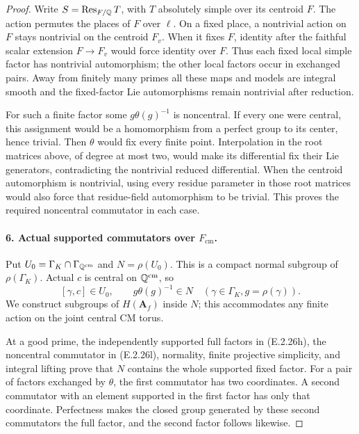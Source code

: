 \begin{proof}
Write \(S=\operatorname{Res}_{F/\mathbb Q}T\), with \(T\)
absolutely simple over its centroid \(F\). The action
permutes the places of \(F\) over \(\ell\). On a
fixed place, a nontrivial action on \(F\) stays
nontrivial on the centroid \(F_v\). When it fixes
\(F\), identity after the faithful scalar extension
\(F\to F_v\) would force identity over \(F\).
Thus each fixed local simple factor has nontrivial
automorphism; the other local factors occur in exchanged
pairs. Away from finitely many primes all these maps
and models are integral smooth and the fixed-factor
Lie automorphisms remain nontrivial after reduction.

For such a finite factor some
\(g\theta(g)^{-1}\) is noncentral. If every one were
central, this assignment would be a homomorphism from
a perfect group to its center, hence trivial. Then
\(\theta\) would fix every finite point. Interpolation
in the root matrices above, of degree at most two,
would make its differential fix their Lie generators,
contradicting the nontrivial reduced differential.
When the centroid automorphism is nontrivial, using
every residue parameter in those root matrices
would also force that residue-field automorphism
to be trivial. This proves the required noncentral
commutator in each case.

\paragraph{6. Actual supported commutators over \(F_{\mathrm{cm}}\).}
Put \(U_0=\Gamma_K\cap\Gamma_{\mathbb Q^{\mathrm{cm}}}\) and
\(N=\rho(U_0)\). This is a compact normal subgroup
of \(\rho(\Gamma_K)\). Actual \(c\) is central on
\(\mathbb Q^{\mathrm{cm}}\), so
\[
 [\gamma,c]\in U_0,
 \qquad g\theta(g)^{-1}\in N
       \quad(\gamma\in\Gamma_K, g=\rho(\gamma)).
 \tag{E.2.26l}
\]
We construct subgroups of \(H(\mathbf A_f)\)
inside \(N\); this accommodates any finite action
on the joint central CM torus.

At a good prime, the independently supported full
factors in (E.2.26h), the noncentral commutator in
(E.2.26l), normality, finite projective simplicity,
and integral lifting prove that \(N\) contains
the whole supported fixed factor. For a pair of
factors exchanged by \(\theta\), the first
commutator has two coordinates. A second commutator
with an element supported in the first factor has
only that coordinate. Perfectness makes the closed
group generated by these second commutators the
full factor, and the second factor follows likewise.


\end{proof}
